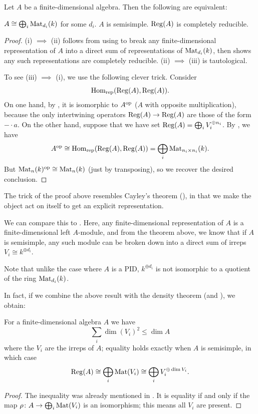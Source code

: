 \begin{theorem}
	Let $A$ be a finite-dimensional algebra.
	Then the following are equivalent:
	\begin{enumerate}[(i)]
		\ii $A \cong \bigoplus_i \mathrm{Mat}_{d_i}(k)$ for some $d_i$.
		\ii $A$ is semisimple.
		\ii $\operatorname{Reg}(A)$ is completely reducible.
	\end{enumerate}
\end{theorem}
\begin{proof}
	(i) $\implies$ (ii) follows from
	using  to break any finite-dimensional
	representation of $A$ into a direct sum of representations of
	$\mathrm{Mat}_{d_i}(k)$, then  shows any such representations are
	completely reducible.
	(ii) $\implies$ (iii) is tautological.

	To see (iii) $\implies$ (i), we use the following clever trick.
	Consider
	\[ \operatorname{Hom}_{\mathrm{rep}}(\operatorname{Reg}(A), \operatorname{Reg}(A)). \]
	On one hand, by ,
	it is isomorphic to $A^{\mathrm{op}}$ ($A$ with opposite multiplication),
	because the only intertwining operators $\operatorname{Reg}(A) \to \operatorname{Reg}(A)$
	are those of the form $- \cdot a$.
	On the other hand, suppose that we have set
	$ \operatorname{Reg}(A) = \bigoplus_i V_i^{\oplus n_i} $.
	By , we have
	\[ A^{\mathrm{op}} \cong \operatorname{Hom}_{\mathrm{rep}}(\operatorname{Reg}(A), \operatorname{Reg}(A))
		= \bigoplus_i \mathrm{Mat}_{n_i \times n_i}(k). \]
	But $\mathrm{Mat}_n(k)^{\mathrm{op}} \cong \mathrm{Mat}_n(k)$ (just by transposing),
	so we recover the desired conclusion.
\end{proof}

\begin{remark}
	The trick of the proof above resembles
	Cayley's theorem (), in that we make the object
	act on itself to get an explicit representation.
\end{remark}

\begin{remark}
	We can compare this to .
	Here, any finite-dimensional representation of $A$ is a
	finite-dimensional left $A$-module, and from the theorem above,
	we know that if $A$ is semisimple, any such module
	can be broken down into a direct sum of irreps $V_i \cong k^{\oplus d_i}$.

	Note that unlike the case where $A$ is a PID,
	$k^{\oplus d_i}$ is not isomorphic to a quotient of the ring $\mathrm{Mat}_{d_i}(k)$.
\end{remark}

In fact, if we combine the above result with
the density theorem (and ), we obtain:
\begin{theorem}
	For a finite-dimensional algebra $A$ we have
	\[ \sum_{i} \dim(V_i)^2 \le \dim A \]
	where the $V_i$ are the irreps of $A$;
	equality holds exactly when $A$ is semisimple,
	in which case
	\[ \operatorname{Reg}(A) \cong \bigoplus_i \mathrm{Mat}(V_i)
		\cong \bigoplus_i V_i^{\oplus \dim V_i}. \]
\end{theorem}
\begin{proof}
	The inequality was already mentioned in .
	It is equality if and only if the map $\rho \colon A \to \bigoplus_i \mathrm{Mat}(V_i)$
	is an isomorphism; this means all $V_i$ are present.
\end{proof}

